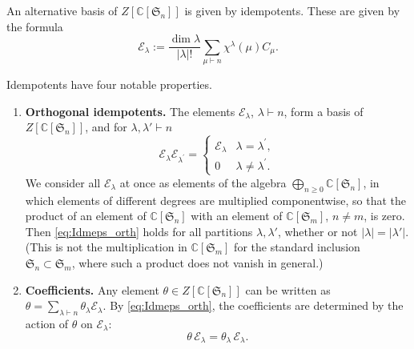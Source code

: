 \documentclass{article}
\theoremstyle{plain}
\theoremstyle{definition}
\numberwithin{equation}{section}
\begin{document}
An alternative basis of $Z[\mathbb{C}[\mathfrak{S}_n]]$ is given by idempotents. These are given by the formula
\begin{equation}
    \label{eq:idemps def}
    \mathcal{E}_\lambda := \frac{\dim \lambda}{|\lambda|!}\sum_{\mu \vdash n} \chi^\lambda(\mu) C_\mu.
\end{equation}

Idempotents have four notable properties. 
\begin{enumerate}
    \item \textbf{Orthogonal idempotents.}
    The elements $\mathcal E_\lambda$, $\lambda\vdash n$, form a basis of $Z[\mathbb C[\mathfrak S_n]]$, and for $\lambda,\lambda'\vdash n$
    \begin{equation}
        \label{eq:Idmeps_orth}
        \mathcal{E}_\lambda \mathcal{E}_{\lambda^{\prime}}= \begin{cases}\mathcal{E}_\lambda & \lambda=\lambda^{\prime}, \\ 0 & \lambda \neq \lambda^{\prime} .\end{cases}
    \end{equation}
    We consider all $\mathcal E_\lambda$ at once as elements of the algebra $\bigoplus_{n\ge0}\mathbb C[\mathfrak S_n]$, in which elements of different degrees are multiplied componentwise, so that the product of an element of $\mathbb C[\mathfrak S_n]$ with an element of $\mathbb C[\mathfrak S_m]$, $n\ne m$, is zero. Then \eqref{eq:Idmeps_orth} holds for all partitions $\lambda,\lambda'$, whether or not $|\lambda|=|\lambda'|$. (This is not the multiplication in $\mathbb C[\mathfrak S_{m}]$ for the standard inclusion $\mathfrak S_n\subset\mathfrak S_m$, where such a product does not vanish in general.)

    \item \textbf{Coefficients.}
    Any element $\theta \in Z[\mathbb{C}[\mathfrak{S}_n]]$ can be written as $\theta=\sum_{\lambda\vdash n}\theta_\lambda\mathcal E_\lambda$. By \eqref{eq:Idmeps_orth}, the coefficients are determined by the action of $\theta$ on $\mathcal E_\lambda$:
    \begin{equation}
        \label{eq:Idmeps coefs}
        \theta\,\mathcal{E}_\lambda = \theta_\lambda\,\mathcal{E}_\lambda.
    \end{equation}
       


\end{enumerate}
\end{document}
